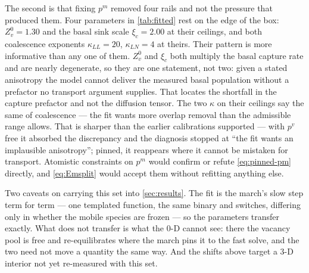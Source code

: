 The second is that fixing $p^{m}$ removed four rails and not the pressure that
produced them. Four
parameters in \cref{tab:fitted} rest on the edge of the box: $Z^{0}_{v}=1.30$
and the basal sink scale $\xi_{c}=2.00$ at their ceilings, and both coalescence
exponents $\kappa_{LL}=20$, $\kappa_{LN}=4$ at theirs. Their pattern is more
informative than any one of them. $Z^{0}_{v}$ and $\xi_{c}$ both multiply the
basal capture rate and are nearly degenerate, so they are one statement, not
two: given a stated anisotropy the model cannot deliver the measured basal
population without a prefactor no transport argument supplies. That locates the
shortfall in the capture prefactor and not the diffusion tensor. The two
$\kappa$ on their ceilings say the same of coalescence --- the fit wants more
overlap removal than the admissible range allows. That is sharper than the earlier
calibrations supported --- with $p^{v}$ free it absorbed the discrepancy and the
diagnosis stopped at ``the fit wants an implausible anisotropy''; pinned, it
reappears where it cannot be mistaken for transport. Atomistic constraints on
$p^{m}$ would confirm or refute \cref{eq:pinned-pm} directly, and
\cref{eq:Emsplit} would accept them without refitting anything else.

Two caveats on carrying this set into \cref{sec:results}. The fit is the
march's slow step term for term --- one templated function, the same binary and
switches, differing only in whether the mobile species are frozen --- so the
parameters transfer exactly. What does not transfer is what the $0$-D cannot
see: there the vacancy pool is free and re-equilibrates where the march pins it
to the fast solve, and the two need not move a quantity the same way. And the
shifts above target a $3$-D interior not yet re-measured with this set.

